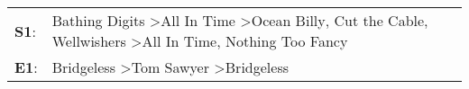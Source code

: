 \begin{supertabular}{p{0.03\textwidth}p{0.92\textwidth}}
 \textbf{S1}:  &  Bathing Digits\textsuperscript{} \textgreater \enspace All In Time\textsuperscript{} \textgreater \enspace Ocean Billy\textsuperscript{}, \enspace Cut the Cable\textsuperscript{}, \enspace Wellwishers\textsuperscript{} \textgreater \enspace All In Time\textsuperscript{}, \enspace Nothing Too Fancy\textsuperscript{}  \enspace  \\
 \textbf{E1}:  &                                                                                                                                                                                            Bridgeless\textsuperscript{} \textgreater \enspace Tom Sawyer\textsuperscript{} \textgreater \enspace Bridgeless\textsuperscript{}  \enspace  \\
\end{supertabular}
